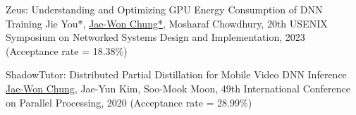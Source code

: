 



\begin{cvlist}

  \cvlistitem
    {Zeus: Understanding and Optimizing GPU Energy Consumption of DNN Training} %
    {Jie You*, \underline{Jae-Won Chung*}, Mosharaf Chowdhury, 20th USENIX Symposium on Networked Systems Design and Implementation, 2023 (Acceptance rate = 18.38\%)} %

  \cvlistitem
    {ShadowTutor: Distributed Partial Distillation for Mobile Video DNN Inference} %
    {\underline{Jae-Won Chung}, Jae-Yun Kim, Soo-Mook Moon, 49th International Conference on Parallel Processing, 2020 (Acceptance rate = 28.99\%)} %

\end{cvlist}
